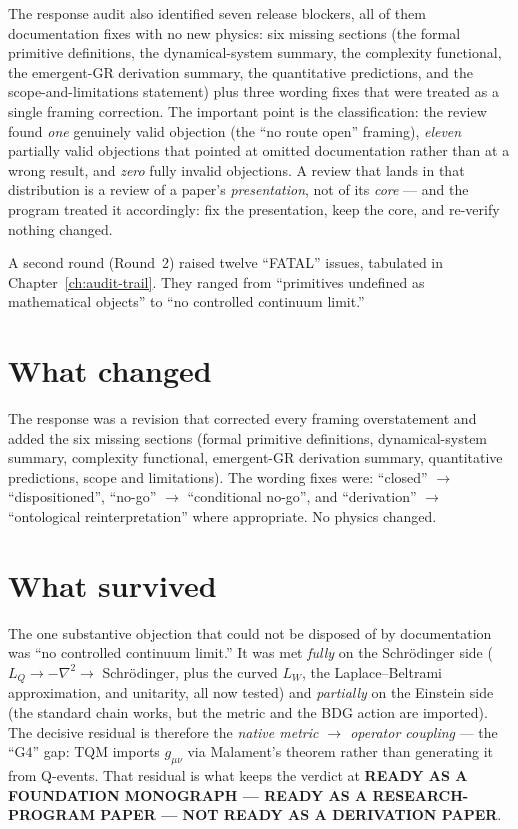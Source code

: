 \documentclass[10pt,twoside,openany]{book}
\begin{document}
The response audit also identified seven release blockers, all of them documentation fixes
with no new physics: six missing sections (the formal primitive definitions, the
dynamical-system summary, the complexity functional, the emergent-GR derivation summary,
the quantitative predictions, and the scope-and-limitations statement) plus three wording
fixes that were treated as a single framing correction. The important point is the
classification: the review found \emph{one} genuinely valid objection (the ``no route open''
framing), \emph{eleven} partially valid objections that pointed at omitted documentation
rather than at a wrong result, and \emph{zero} fully invalid objections. A review that
lands in that distribution is a review of a paper's \emph{presentation}, not of its
\emph{core} --- and the program treated it accordingly: fix the presentation, keep the
core, and re-verify nothing changed.

A second round (Round~2) raised twelve ``FATAL'' issues, tabulated in
Chapter~\ref{ch:audit-trail}. They ranged from ``primitives undefined as mathematical
objects'' to ``no controlled continuum limit.''

\section{What changed}

The response was a revision that corrected every framing overstatement and added the six
missing sections (formal primitive definitions, dynamical-system summary, complexity
functional, emergent-GR derivation summary, quantitative predictions, scope and
limitations). The wording fixes were: ``closed'' $\to$ ``dispositioned'', ``no-go'' $\to$
``conditional no-go'', and ``derivation'' $\to$ ``ontological reinterpretation'' where
appropriate. No physics changed.

\section{What survived}

The one substantive objection that could not be disposed of by documentation was ``no
controlled continuum limit.'' It was met \emph{fully} on the Schr\"odinger side
($L_Q\to-\nabla^2\to$ Schr\"odinger, plus the curved $L_W$, the Laplace--Beltrami
approximation, and unitarity, all now tested) and \emph{partially} on the Einstein side
(the standard chain works, but the metric and the BDG action are imported). The decisive
residual is therefore the \emph{native metric $\to$ operator coupling} --- the ``G4'' gap:
TQM imports $g_{\mu\nu}$ via Malament's theorem rather than generating it from Q-events.
That residual is what keeps the verdict at \textbf{READY AS A FOUNDATION MONOGRAPH ---
READY AS A RESEARCH-PROGRAM PAPER --- NOT READY AS A DERIVATION PAPER}.
\end{document}
